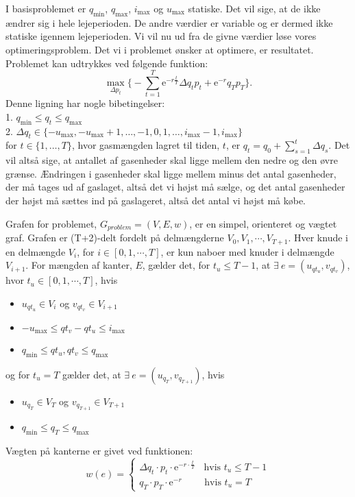 I basisproblemet er $q_{\min}$, $q_{\max}$, $i_{\max}$ og $u_{\max}$ statiske. Det vil sige, at de ikke ændrer sig i hele lejeperioden. De andre værdier er variable og er dermed ikke statiske igennem lejeperioden. Vi vil nu ud fra de givne værdier løse vores optimeringsproblem. Det vi i problemet ønsker at optimere, er resultatet. Problemet kan udtrykkes ved følgende funktion:
\begin{equation}
\max_{\Delta p_{t}} \Bigg\{ -\sum_{t=1}^{T} \mathrm{e}^{-r\frac{t}{T}} \Delta q_{t} p_{t}+ \mathrm{e}^{-r}q_{T}p_{T} \Bigg\}.
\end{equation}
Denne ligning har nogle bibetingelser:\\
1. $q_{\min} \leq q_{t} \leq q_{\max}$\\
2. $\Delta q_{t} \in \{-u_{\max},-u_{\max}+1,\dotsc,-1,0,1,\dotsc,i_{\max}-1,i_{\max} \}$ \\
for $t \in \{1,\dotsc,T\}$, hvor gasmængden lagret til tiden, $t$, er $q_{t}=q_{0}+\sum_{s=1}^{t} \Delta q_{s}$.
Det vil altså sige, at antallet af gasenheder skal ligge mellem den nedre og den øvre grænse. Ændringen i gasenheder skal ligge mellem minus det antal gasenheder, der må tages ud af gaslaget, altså det vi højst må sælge, og det antal gasenheder der højst må sættes ind på gaslageret, altså det antal vi højst må købe.


\begin{defn}
Grafen for problemet, $G_{problem}=(V,E,w)$, er en simpel, orienteret og vægtet graf. Grafen er (T+2)-delt fordelt på delmængderne $V_0,V_1, \cdots, V_{T+1}$.
Hver knude i en delmængde $V_i$, for $i \in [0,1, \cdots, T]$, er kun naboer med knuder i delmængde $V_{i+1}$. 
For mængden af kanter, $E$, gælder det, for $t_u \leq T-1$, at $\exists \ e=(u_{qt_u}, v_{qt_v})$, hvor $t_u \in [0,1, \cdots, T]$, hvis
	\begin{itemize}
	\item $u_{qt_u} \in V_i$ og $v_{qt_v} \in V_{i+1}$
	\item $-u_{\max} \leq qt_v-qt_u \leq i_{\max}$
	\item $q_{\min} \leq qt_u,qt_v \leq q_{\max}$
	\end{itemize}
og for $t_u = T$ gælder det, at $\exists \ e = (u_{q_T}, v_{q_{T+1}})$, hvis
	\begin{itemize}
	\item $u_{q_{T}} \in V_T$ og $v_{q_{T+1}} \in V_{T+1}$
	\item $q_{\min} \leq q_{T} \leq q_{\max} $
	\end{itemize}

Vægten på kanterne er givet ved funktionen:
\begin{equation}
w(e)=
	\begin{cases}
	\Delta q_t \cdot p_t \cdot \textrm{e}^{-r \cdot \frac{t}{T}} \ \ \ \ \mbox{hvis } t_u \leq T-1 \\
	q_T \cdot p_T \cdot \textrm{e}^{-r} \qquad \mbox{ hvis } t_u=T
	\end{cases}
\end{equation}



\end{defn}
